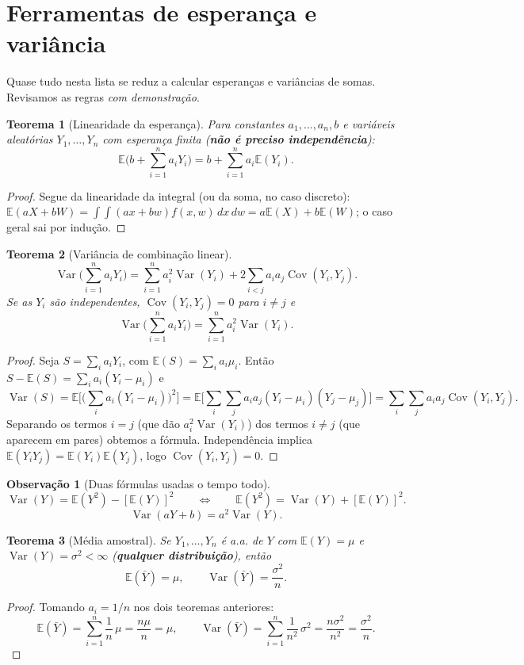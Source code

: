 \documentclass[11pt,a4paper]{article}
\theoremstyle{definition}
\newtheorem{observacao}{Observação}[section]
\theoremstyle{plain}
\newtheorem{teorema}{Teorema}[section]
\newcommand{\E}{\mathbb{E}}
\newcommand{\Var}{\operatorname{Var}}
\newcommand{\Cov}{\operatorname{Cov}}
\newcommand{\bY}{\bar{Y}}
\begin{document}
\section{Ferramentas de esperança e variância}

Quase tudo nesta lista se reduz a calcular esperanças e variâncias de somas. Revisamos as regras \emph{com demonstração}.

\begin{teorema}[Linearidade da esperança]
Para constantes $a_1,\dots,a_n,b$ e variáveis aleatórias $Y_1,\dots,Y_n$ com esperança finita (\textbf{não é preciso independência}):
\[
\E\Big(b + \sum_{i=1}^n a_i Y_i\Big) = b + \sum_{i=1}^n a_i \E(Y_i).
\]
\end{teorema}
\begin{proof}
Segue da linearidade da integral (ou da soma, no caso discreto): $\E(aX+bW) = \int\!\!\int (ax+bw)f(x,w)\,dx\,dw = a\E(X)+b\E(W)$; o caso geral sai por indução.
\end{proof}

\begin{teorema}[Variância de combinação linear]
\[
\Var\Big(\sum_{i=1}^n a_iY_i\Big) = \sum_{i=1}^n a_i^2\Var(Y_i) + 2\sum_{i<j} a_ia_j\Cov(Y_i,Y_j).
\]
Se as $Y_i$ são independentes, $\Cov(Y_i,Y_j)=0$ para $i\neq j$ e
\[
\Var\Big(\sum_{i=1}^n a_iY_i\Big) = \sum_{i=1}^n a_i^2\Var(Y_i).
\]
\end{teorema}
\begin{proof}
Seja $S=\sum_i a_iY_i$, com $\E(S)=\sum_i a_i\mu_i$. Então $S-\E(S)=\sum_i a_i(Y_i-\mu_i)$ e
\[
\Var(S)=\E\Big[\Big(\sum_i a_i(Y_i-\mu_i)\Big)^2\Big]
=\E\Big[\sum_i\sum_j a_ia_j(Y_i-\mu_i)(Y_j-\mu_j)\Big]
=\sum_i\sum_j a_ia_j\Cov(Y_i,Y_j).
\]
Separando os termos $i=j$ (que dão $a_i^2\Var(Y_i)$) dos termos $i\neq j$ (que aparecem em pares) obtemos a fórmula. Independência implica $\E(Y_iY_j)=\E(Y_i)\E(Y_j)$, logo $\Cov(Y_i,Y_j)=0$.
\end{proof}

\begin{observacao}[Duas fórmulas usadas o tempo todo]
\[
\Var(Y)=\E(Y^2)-[\E(Y)]^2
\qquad\Longleftrightarrow\qquad
\E(Y^2)=\Var(Y)+[\E(Y)]^2 .
\]
\[
\Var(aY+b)=a^2\Var(Y).
\]
\end{observacao}

\begin{teorema}[Média amostral]\label{teo:media}
Se $Y_1,\dots,Y_n$ é a.a. de $Y$ com $\E(Y)=\mu$ e $\Var(Y)=\sigma^2<\infty$ (\textbf{qualquer distribuição}), então
\[
\E(\bY)=\mu, \qquad \Var(\bY)=\frac{\sigma^2}{n}.
\]
\end{teorema}
\begin{proof}
Tomando $a_i=1/n$ nos dois teoremas anteriores:
\[
\E(\bY)=\sum_{i=1}^n\frac1n\,\mu=\frac{n\mu}{n}=\mu,
\qquad
\Var(\bY)=\sum_{i=1}^n\frac1{n^2}\,\sigma^2=\frac{n\sigma^2}{n^2}=\frac{\sigma^2}{n}.
\]
\end{proof}
\end{document}
